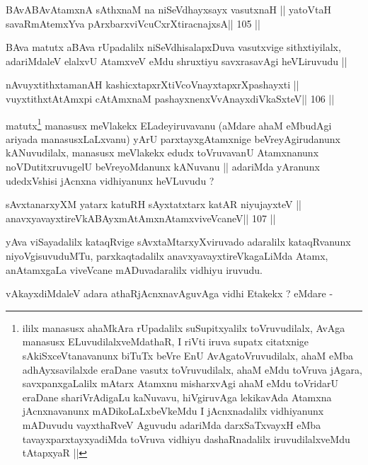 \begin{shl}
BAvABAvAtamxnA sAthxnaM na niSeVdhayxsayx vasutxnaH ||
yatoV\s taH savaRmAtemxYva pArxbarxviVcuCxrXtiracnajxsA\hfill || 105 ||
\end{shl}

\begin{artha}
BAva matutx aBAva rUpadalilx niSeVdhisalapxDuva vasutxvige
sithxtiyilalx, adariMdaleV elalxvU AtamxveV eMdu shruxtiyu
savxrasavAgi heVLiruvudu ||
\end{artha}

\begin{shl}
nAvuyxtithxtamanAH kashicxtapxrXtiVcoV\s nayxtapxrXpashayxti ||
vuyxtithxtAtAmx\s pi cA\s\s tAmxnaM pashayxnenxVvAnayxdiVkaSxteV\hfill || 106 ||
\end{shl}

\begin{artha}
matutx\footnote[1]{ililx manasusx ahaMkAra rUpadalilx suSupitxyalilx
  toVruvudilalx, AvAga manasusx ELuvudilalxveMdathaR, I riVti iruva
  supatx citatxnige sAkiSxceVtanavanunx biTuTx beVre EnU
  AvAgatoVruvudilalx, ahaM eMba adhAyxsavilalxde eraDane vasutx
  toVruvudilalx, ahaM eMdu toVruva jAgara, savxpanxgaLalilx mAtarx
  Atamxnu misharxvAgi ahaM eMdu toVridarU eraDane shariVrAdigaLu
  kaNuvavu, hiVgiruvAga lekikavAda Atamxna jAcnxnavanunx
  mADikoLaLxbeVkeMdu I jAcnxnadalilx vidhiyanunx mADuvudu vayxthaRveV
  Aguvudu adariMda darxSaTxvayxH eMba tavayxparxtayxyadiMda toVruva
  vidhiyu dashaRnadalilx iruvudilalxveMdu tAtapxyaR ||} manasusx meVlakekx ELadeyiruvavanu (aMdare
ahaM eMbudAgi ariyada manasusxLaLxvanu) yArU parxtayxgAtamxnige
beVreyAgirudanunx kANuvudilalx, manasusx meVlakekx edudx toVruvavanU
Atamxnanunx  noVDutitxruvugelU beVreyoMdanunx kANuvanu || adariMda
yAranunx udedxVshisi jAcnxna vidhiyanunx heVLuvudu ?
\end{artha}

\begin{shl}
sAvxtanarxyXM yatarx katuRH sAyxtatxtarx katAR niyujayxteV ||
\footnotemark[2]anavxyavayxtireVkABAyxmAtAmxnAtamxviveVcaneV\hfill || 107 ||
\end{shl}

\begin{artha}
yAva viSayadalilx kataqRvige sAvxtaMtarxyXviruvado adaralilx
kataqRvanunx niyoVgisuvuduMTu, parxkaqtadalilx
anavxyavayxtireVkagaLiMda Atamx, anAtamxgaLa viveVcane mADuvadaralilx
vidhiyu iruvudu.
\end{artha}

\begin{artha}
vAkayxdiMdaleV adara athaRjAcnxnavAguvAga vidhi Etakekx ? eMdare -
\end{artha}

